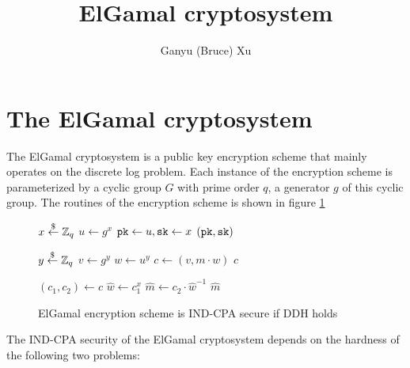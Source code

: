 \documentclass{article}
\title{
    ElGamal cryptosystem
}
\author{
    Ganyu (Bruce) Xu
}
\begin{document}
\maketitle

\section{The ElGamal cryptosystem}
The ElGamal cryptosystem is a public key encryption scheme that mainly operates on the discrete log problem. Each instance of the encryption scheme is parameterized by a cyclic group $G$ with prime order $q$, a generator $g$ of this cyclic group. The routines of the encryption scheme is shown in figure \ref{fig:cpa-elgamal-routines}

\begin{figure}[H]
    \begin{algorithm}[H]
        \caption{$\keygen$}
        \begin{algorithmic}[1]
            \State $x \stackrel{\$}{\leftarrow} \mathbb{Z}_q$
            \State $u \leftarrow g^x$
            \State $\texttt{pk} \leftarrow u, \texttt{sk} \leftarrow x$
            \State \Return $(\texttt{pk}, \texttt{sk})$
        \end{algorithmic}
    \end{algorithm}
    \begin{algorithm}[H]
        \caption{$\encrypt(\pk = u, m \in G)$}
        \begin{algorithmic}[1]
            \State $y \stackrel{\$}{\leftarrow} \mathbb{Z}_q$
            \State $v \leftarrow g^y$
            \State $w \leftarrow u^y$
            \State $c \leftarrow (v, m \cdot w)$
            \State \Return $c$
        \end{algorithmic}
    \end{algorithm}
    \begin{algorithm}[H]
        \caption{$\decrypt(\sk = x, c)$}
        \begin{algorithmic}[1]
            \State $(c_1, c_2) \leftarrow c$
            \State $\hat{w} \leftarrow c_1^x$
            \State $\hat{m} \leftarrow c_2 \cdot \hat{w}^{-1}$
            \State \Return $\hat{m}$
        \end{algorithmic}
    \end{algorithm}
    \caption{ElGamal encryption scheme is IND-CPA secure if DDH holds}\label{fig:cpa-elgamal-routines}
\end{figure}

The IND-CPA security of the ElGamal cryptosystem depends on the hardness of the following two problems:
\end{document}
